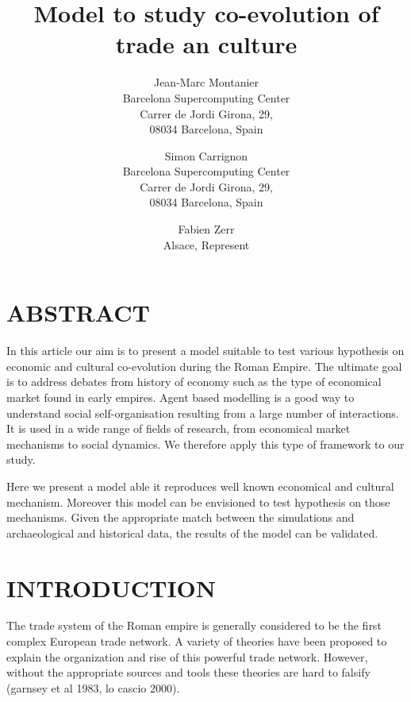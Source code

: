 \documentclass{wscpaperproc}
\begin{document}

\title{Model to study co-evolution of trade an culture}

\author{Jean-Marc Montanier\\ [12pt]
Barcelona Supercomputing Center\\
Carrer de Jordi Girona, 29, \\
08034 Barcelona, Spain\\
\and
Simon Carrignon\\ [12pt]
Barcelona Supercomputing Center\\
Carrer de Jordi Girona, 29, \\
08034 Barcelona, Spain\\
\and
Fabien Zerr\\ [12pt]
Alsace, Represent
}






\maketitle


\section*{ABSTRACT}

In this article our aim is to present a model suitable to test various hypothesis on economic and cultural co-evolution during the Roman Empire. The ultimate goal is to address debates from history of economy such as the type of economical market found in early empires. Agent based modelling is a good way to understand social self-organisation resulting from a large number of interactions. It is used in a wide range of fields of research, from economical market mechanisms to social dynamics. We therefore apply this type of framework to our study.

Here we present a model able it reproduces well known economical and cultural mechanism. Moreover this model can be envisioned to test hypothesis on those mechanisms. Given the appropriate match between the simulations and archaeological and historical data, the results of the model can be validated.


\section{INTRODUCTION}

The trade system of the Roman empire is generally considered to be the first complex European trade network. A variety of theories have been proposed to explain the organization and rise of this powerful trade network. However, without the appropriate sources and tools these theories are hard to falsify (garnsey et al 1983, lo cascio 2000). 
\end{document}
